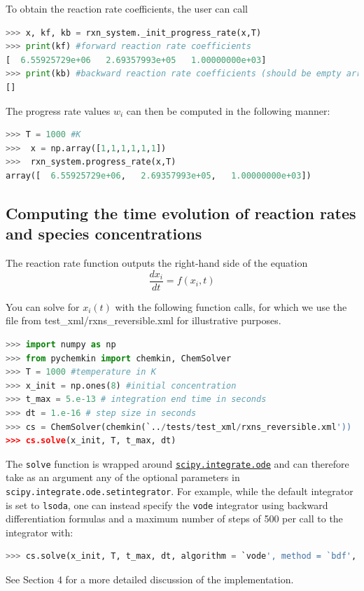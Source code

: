 \documentclass[12pt]{article}
\begin{document}
To obtain the reaction rate coefficients, the user can call 
\begin{lstlisting}[language = Python, basicstyle = \ttfamily,columns = fullflexible, showstringspaces = False]
>>> x, kf, kb = rxn_system._init_progress_rate(x,T)
>>> print(kf) #forward reaction rate coefficients
[  6.55925729e+06   2.69357993e+05   1.00000000e+03]
>>> print(kb) #backward reaction rate coefficients (should be empty array since all reactions are irreversible)
[]
\end{lstlisting}

The progress rate values $w_i$ can then be computed in the following manner:
\begin{lstlisting}[language = Python, basicstyle = \ttfamily,columns = fullflexible, showstringspaces = False]
>>> T = 1000 #K
>>>  x = np.array([1,1,1,1,1,1])
>>>  rxn_system.progress_rate(x,T)
array([  6.55925729e+06,   2.69357993e+05,   1.00000000e+03])
\end{lstlisting}

\subsection{Computing the time evolution of reaction rates and species concentrations}
The reaction rate function outputs the right-hand side of the equation
\begin{equation}
\frac{dx_i}{dt} = f(x_i, t)
\end{equation}

You can solve for $x_i(t)$ with the following function calls, for which we use the file from test\_xml/rxns\_reversible.xml for illustrative purposes. 
\begin{lstlisting}[language = Python, basicstyle = \ttfamily,columns = fullflexible, showstringspaces = False]
>>> import numpy as np
>>> from pychemkin import chemkin, ChemSolver
>>> T = 1000 #temperature in K
>>> x_init = np.ones(8) #initial concentration
>>> t_max = 5.e-13 # integration end time in seconds
>>> dt = 1.e-16 # step size in seconds
>>> cs = ChemSolver(chemkin(`../tests/test_xml/rxns_reversible.xml'))
>>> cs.solve(x_init, T, t_max, dt)
\end{lstlisting}

The \texttt{solve} function is wrapped around \href{https://docs.scipy.org/doc/scipy/reference/generated/scipy.integrate.ode.html}{\texttt{scipy.integrate.ode}} and can therefore take as an argument any of the optional parameters in \texttt{scipy.integrate.ode.setintegrator}. For example, while the default integrator is set to \texttt{lsoda}, one can instead specify the \texttt{vode} integrator using backward differentiation formulas and a maximum number of steps of 500 per call to the integrator with: 
\begin{lstlisting}[language = Python, basicstyle = \ttfamily,columns = fullflexible, showstringspaces = False]
>>> cs.solve(x_init, T, t_max, dt, algorithm = `vode', method = `bdf', nsteps = 500). 

\end{lstlisting}
See Section 4 for a more detailed discussion of the implementation. 
\end{document}
